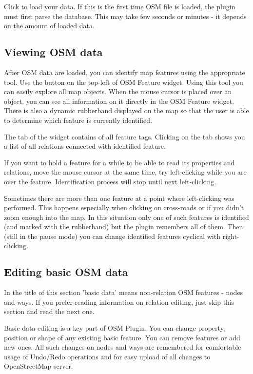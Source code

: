 Click  to load your data. If this is the first time OSM
file is loaded, the plugin must first parse the database. This may take few
seconds or minutes - it depends on the amount of loaded data.

\subsection{Viewing OSM data}

After OSM data are loaded, you can identify map features using the
appropriate tool. Use the 
button on the top-left of OSM Feature widget. Using this tool you can
easily explore all map objects. When the mouse cursor is placed over an
object, you can see all information on it directly in the OSM Feature widget.
There is also a dynamic rubberband displayed on the map so that the user
is able to determine which feature is currently identified.

The  tab of the widget contains of all feature tags.
Clicking on the  tab shows you a list of all relations
connected with identified feature.

If you want to hold a feature for a while to be able to read its properties
and relations, move the mouse cursor at the same time, try left-clicking
while you are over the feature. Identification process will stop until next
left-clicking.

Sometimes there are more than one feature at a point where left-clicking
was performed. This happens especially when clicking on cross-roads or if
you didn't zoom enough into the map. In this situation only one of such
features is identified (and marked with the rubberband) but the plugin
remembers all of them. Then (still in the pause mode) you can change
identified features cyclical with right-clicking.

\subsection{Editing basic OSM data}

In the title of this section 'basic data' means non-relation OSM features -
nodes and ways. If you prefer reading information on relation editing, just
skip this section and read the next one.

Basic data editing is a key part of OSM Plugin. You can change property,
position or shape of any existing basic feature. You can remove features or
add new ones. All such changes on nodes and ways are remembered for
comfortable usage of Undo/Redo operations and for easy upload of all changes
to OpenStreetMap server.

